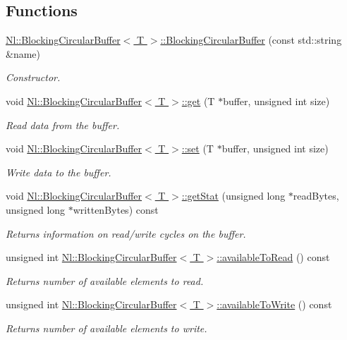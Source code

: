 \subsection*{Functions}
\begin{DoxyCompactItemize}
\item 
\hyperlink{group__Audio_gaff1f3f4ae609326ed19b4764a7516c32}{Nl\+::\+Blocking\+Circular\+Buffer$<$ T $>$\+::\+Blocking\+Circular\+Buffer} (const std\+::string \&name)
\begin{DoxyCompactList}\small\item\em Constructor. \end{DoxyCompactList}\item 
void \hyperlink{group__Audio_ga3923df13e2115ece2a5f4969a9b2f890}{Nl\+::\+Blocking\+Circular\+Buffer$<$ T $>$\+::get} (T $\ast$buffer, unsigned int size)
\begin{DoxyCompactList}\small\item\em Read data from the buffer. \end{DoxyCompactList}\item 
void \hyperlink{group__Audio_gab60ad480d2ebe4b2aa526d31d808be7a}{Nl\+::\+Blocking\+Circular\+Buffer$<$ T $>$\+::set} (T $\ast$buffer, unsigned int size)
\begin{DoxyCompactList}\small\item\em Write data to the buffer. \end{DoxyCompactList}\item 
void \hyperlink{group__Audio_ga012421a899e2da4cf994556ccfcb1880}{Nl\+::\+Blocking\+Circular\+Buffer$<$ T $>$\+::get\+Stat} (unsigned long $\ast$read\+Bytes, unsigned long $\ast$written\+Bytes) const 
\begin{DoxyCompactList}\small\item\em Returns information on read/write cycles on the buffer. \end{DoxyCompactList}\item 
unsigned int \hyperlink{group__Audio_ga75e3bbb71d5eeb19224f1503d58e1b0a}{Nl\+::\+Blocking\+Circular\+Buffer$<$ T $>$\+::available\+To\+Read} () const 
\begin{DoxyCompactList}\small\item\em Returns number of available elements to read. \end{DoxyCompactList}\item 
unsigned int \hyperlink{group__Audio_ga440f66059781b20486d6d6c160e4f0ed}{Nl\+::\+Blocking\+Circular\+Buffer$<$ T $>$\+::available\+To\+Write} () const 
\begin{DoxyCompactList}\small\item\em Returns number of available elements to write. \end{DoxyCompactList}\item 

\end{DoxyCompactItemize}
